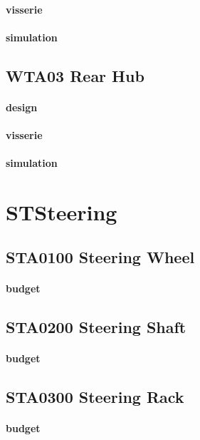 		\paragraph{visserie} 
		\paragraph{simulation} 
	\subsection*{WTA03 Rear Hub} 
 \par 
		\paragraph{design} 
		\paragraph{visserie} 
		\paragraph{simulation} 
\newpage 
 \section*{ST\textunderscore Steering} 
 \par 
	\subsection*{ST\textunderscore A0100 Steering Wheel} 
 \par 
		\paragraph{budget} 
	\subsection*{ST\textunderscore A0200 Steering Shaft} 
 \par 
		\paragraph{budget} 
	\subsection*{ST\textunderscore A0300 Steering Rack} 
 \par 
		\paragraph{budget} 

